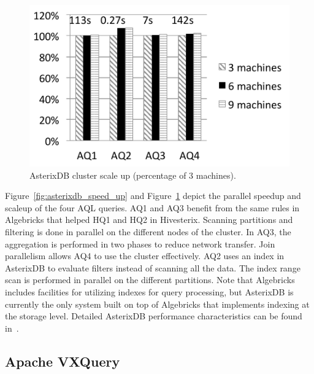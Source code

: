 \begin{figure}[tb]
\includegraphics[width=\columnfigurewidth]{images/asterix_scale_up}
\centering
\vspace{-2ex}
\caption{AsterixDB cluster scale up (percentage of 3 machines).}
\label{fig:asterixdb_scale_up}
\end{figure}

Figure~\ref{fig:asterixdb_speed_up} and Figure~\ref{fig:asterixdb_scale_up} depict the parallel speedup and scaleup of the four AQL queries. AQ1 and AQ3 benefit from the same rules in Algebricks that helped HQ1 and HQ2 in Hivesterix. Scanning partitions and filtering is done in parallel on the different nodes of the cluster. In AQ3, the aggregation is performed in two phases to reduce network transfer. Join parallelism allows AQ4 to use the cluster effectively. AQ2 uses an index in AsterixDB to evaluate filters instead of scanning all the data. The index range scan is performed in parallel on the different partitions. Note that Algebricks includes facilities for utilizing indexes for query processing, but AsterixDB is currently the only system built on top of Algebricks that implements indexing at the storage level.
Detailed AsterixDB performance characteristics can be found in~\cite{ASTERIX}.



\subsection{Apache VXQuery}\label{sec:VXQuery}


